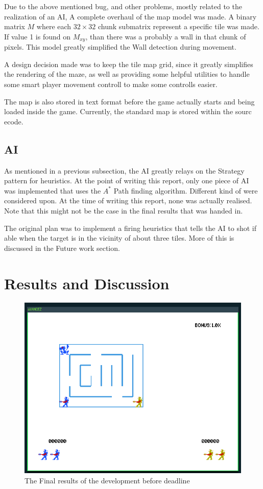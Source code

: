 \documentclass{article}
\begin{document}
  Due to the above mentioned bug, and other problems, mostly related to the realization of an AI, A complete overhaul of the map model was made. A binary matrix $M$ where each $32\times32$ chunk submatrix represent a specific tile was made. If value 1 is found on $M_{xy}$, than there was a probably a wall in that chunk of pixels. This model greatly simplified the Wall detection during movement.

  A design decision made was to keep the tile map grid, since it greatly simplifies the rendering of the maze, as well as providing some helpful utilities to handle some smart player movement controll to make some controlls easier.

  The map is also stored in text format before the game actually starts and being loaded inside the game. Currently, the standard map is stored within the sourc ecode.

  \subsection{AI}
  As mentioned in a previous subsection, the AI greatly relays on the Strategy pattern for heuristics. At the point of writing this report, only one piece of AI was implemented that uses the $A^*$ Path finding algorithm. Different kind of were considered upon. At the time of writing this report, none was actually realised. Note that this might not be the case in the final results that was handed in.

  The original plan was to implement a firing heuristics that tells the AI to shot if able when the target is in the vicinity of about three tiles. More of this is discussed in the Future work section.

  \section{Results and Discussion}
  \begin{figure}
    \includegraphics[scale=0.5]{assets/lateximg/InGameScreenshot}
    \caption{The Final results of the development before deadline}
    \label{game}
  \end{figure}
\end{document}
